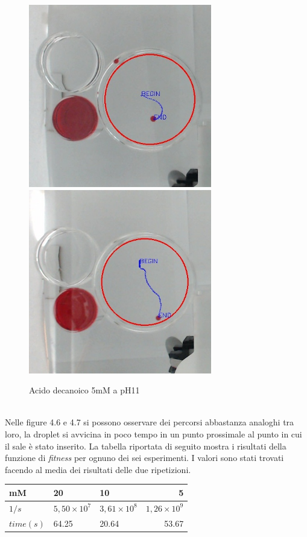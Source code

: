 \begin{figure}[h]
	\centering
   		{\includegraphics[width=8cm]{immagini/5mMpH11-2.jpg}}
 	\hspace{2mm}   	
		{\includegraphics[width=8cm]{immagini/5mMpH11-1.jpg}}
	\caption{Acido decanoico 5mM a pH11}
\end{figure}
\pagebreak
\\Nelle figure 4.6 e 4.7 si possono osservare dei percorsi abbastanza analoghi tra loro, la droplet si avvicina in poco tempo in un punto prossimale al punto in cui il sale è stato inserito.
La tabella riportata di seguito mostra i risultati della funzione di \emph{fitness} per ognuno dei sei esperimenti. I valori sono stati trovati facendo al media dei risultati delle due ripetizioni.
\begin{center}
\begin{tabular}{|l|l|l|r|}
	\hline
	mM&20&10&5\\
	\hline
	$1/s$&$5,50\times {10}^{7}$&$3,61\times {10}^{8}$&$1,26\times {10}^{9}$\\
	\hline
	$time(s)$& 64.25 & 20.64 & 53.67\\
	\hline
\end{tabular}
\end{center}
\pagebreak

